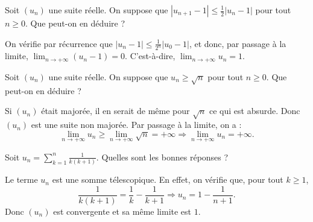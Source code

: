 \begin{question}

Soit $(u_n)$ une suite réelle. On suppose que $\displaystyle |u_{n+1}-1|\leq \frac{1}{2}|u_n-1|$ pour tout $n\geq 0$. Que peut-on en déduire ?
\begin{answers}  
\end{answers}
\begin{explanations}
On vérifie par récurrence que $\displaystyle |u_n-1|\leq \frac{1}{2^n}|u_0-1|$, et donc, par passage à la limite, $\displaystyle \lim _{n\to +\infty}(u_n-1)=0$. C'est-à-dire, $\displaystyle \lim _{n\to +\infty}u_n=1$.
\end{explanations}
\end{question}


\begin{question}

Soit $(u_n)$ une suite réelle. On suppose que $\displaystyle u_n\geq \sqrt{n}$ pour tout $n\geq 0$. Que peut-on en déduire ?
\begin{answers}
\end{answers}
\begin{explanations}
Si $(u_n)$ était majorée, il en serait de même pour $\sqrt{n}$ ce qui est absurde. Donc $(u_n)$ est une suite non majorée. Par passage à la limite, on a :
$$\lim _{n\to +\infty}u_n\geq \lim _{n\to +\infty}\sqrt{n}=+\infty\Rightarrow \displaystyle \lim _{n\to +\infty}u_n=+\infty.$$
\end{explanations}
\end{question}




\begin{question}

Soit $\displaystyle u_n=\sum _{k=1}^n\frac{1}{k(k+1)}$. Quelles sont les bonnes réponses ?
\begin{answers}  
\end{answers}
\begin{explanations}
Le terme $u_n$ est une somme télescopique. En effet, on vérifie que, pour tout $k\geq 1$,
$$\frac{1}{k(k+1)}=\frac{1}{k}-\frac{1}{k+1}\Rightarrow u_n=1-\frac{1}{n+1}.$$
Donc $(u_n)$ est convergente et sa même limite est $1$.
\end{explanations}
\end{question}




